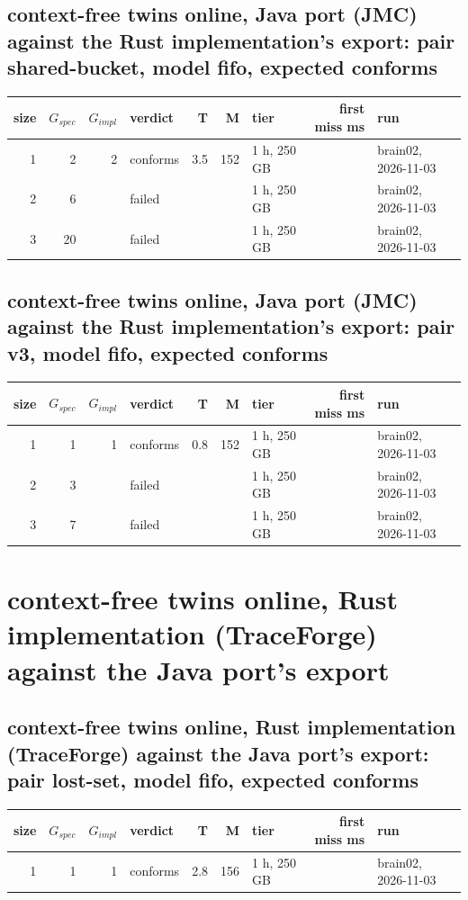 \documentclass[10pt]{article}
\begin{document}
\subsection*{context-free twins online, Java port (JMC) against the Rust implementation's export: pair \textsf{shared-bucket}, model fifo, expected conforms}
\begin{longtable}{@{}rrrlrrlrl@{}}
\toprule
size & $G_{\mathit{spec}}$ & $G_{\mathit{impl}}$ & verdict & T & M & tier & first miss ms & run \\
\midrule
\endhead
\color{red} 1 & 2 & 2 & conforms & 3.5 & 152 & 1 h, 250 GB &  & brain02, 2026-11-03 \\
\color{blue} 2 & 6 &  & failed &  &  & 1 h, 250 GB &  & brain02, 2026-11-03 \\
\color{blue} 3 & 20 &  & failed &  &  & 1 h, 250 GB &  & brain02, 2026-11-03 \\
\bottomrule
\end{longtable}
\subsection*{context-free twins online, Java port (JMC) against the Rust implementation's export: pair \textsf{v3}, model fifo, expected conforms}
\begin{longtable}{@{}rrrlrrlrl@{}}
\toprule
size & $G_{\mathit{spec}}$ & $G_{\mathit{impl}}$ & verdict & T & M & tier & first miss ms & run \\
\midrule
\endhead
\color{red} 1 & 1 & 1 & conforms & 0.8 & 152 & 1 h, 250 GB &  & brain02, 2026-11-03 \\
\color{blue} 2 & 3 &  & failed &  &  & 1 h, 250 GB &  & brain02, 2026-11-03 \\
\color{blue} 3 & 7 &  & failed &  &  & 1 h, 250 GB &  & brain02, 2026-11-03 \\
\bottomrule
\end{longtable}
\section*{context-free twins online, Rust implementation (TraceForge) against the Java port's export}
\subsection*{context-free twins online, Rust implementation (TraceForge) against the Java port's export: pair \textsf{lost-set}, model fifo, expected conforms}
\begin{longtable}{@{}rrrlrrlrl@{}}
\toprule
size & $G_{\mathit{spec}}$ & $G_{\mathit{impl}}$ & verdict & T & M & tier & first miss ms & run \\
\midrule
\endhead
\color{red} 1 & 1 & 1 & conforms & 2.8 & 156 & 1 h, 250 GB &  & brain02, 2026-11-03 \\
\bottomrule
\end{longtable}
\end{document}
